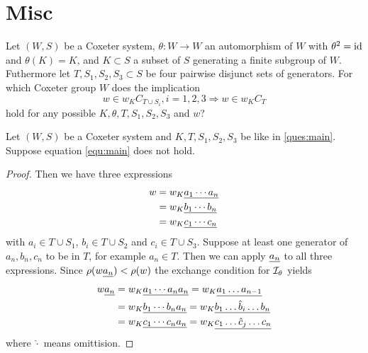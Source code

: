 \section{Misc}

\begin{ques}
\label{ques:main}
Let $(W,S)$ be a Coxeter system, $\theta : W \to W$ an automorphism of $W$ with
$\theta^2 = \operatorname{id}$ and $\theta(K) = K$, and $K \subset S$ a subset of $S$ generating
a finite subgroup of $W$. Futhermore let $T,S_1,S_2,S_3 \subset S$ be four pairwise
disjunct sets of generators. For which Coxeter group $W$ does the implication
\begin{equation}
\label{equ:main}
w \in w_K C_{T \cup S_i}, i=1,2,3 \Rightarrow w \in w_K C_T
\end{equation}
hold for any possible $K,\theta,T,S_1,S_2,S_3$ and $w$?
\end{ques}

\begin{prop}
Let $(W,S)$ be a Coxeter system and $K,T,S_1,S_2,S_3$ be like in \ref{ques:main}.
Suppose equation \ref{equ:main} does not hold.
\begin{proof}

Then we have three expressions
\begin{align*}
w & = w_K \underline{ a_1 \cdots a_n } \\
  & = w_K \underline{ b_1 \cdots b_n } \\
  & = w_K \underline{ c_1 \cdots c_n }
\end{align*}
with $a_i \in T \cup S_1$, $b_i \in T \cup S_2$ and $c_i \in T \cup S_3$. Suppose
at least one generator of $a_n,b_n,c_n$ to be in $T$, for example $a_n \in T$.
Then we can apply $\underline{a_n}$ to all three expressions. Since $\rho (w \underline{a_n}) < \rho(w)$
the exchange condition for $\mathcal{I}_{\theta}$ \cite[Proposition 3.10]{hultman:comb-twisted-invo}
yields
\begin{align*}
w \underline{a_n} & = w_K \underline{ a_1 \cdots a_n a_n } = w_K \underline{ a_1 \ldots a_{n-1} } \\
           & = w_K \underline{ b_1 \cdots b_n a_n } = w_K \underline{ b_1 \ldots \hat b_i \ldots b_n } \\
           & = w_K \underline{ c_1 \cdots c_n a_n } = w_K \underline{ c_1 \ldots \hat c_j \ldots c_n }
\end{align*}
where $\hat \cdot$ means omittision.
\end{proof}
\end{prop}